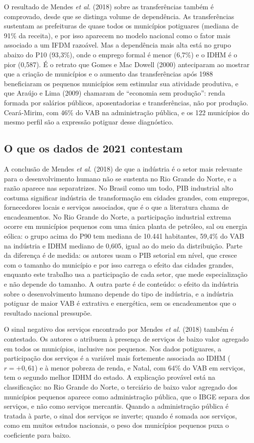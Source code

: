 \documentclass[12pt,a4paper]{article}
\begin{document}
O resultado de Mendes \textit{et al.} (2018) sobre as transferências também é comprovado, desde que se distinga volume de dependência. As transferências sustentam as prefeituras de quase todos os municípios potiguares (mediana de 91\% da receita), e por isso aparecem no modelo nacional como o fator mais associado a um IFDM razoável. Mas a dependência mais alta está no grupo abaixo do P10 (93,3\%), onde o emprego formal é menor (6,7\%) e o IDHM é o pior (0,587). É o retrato que Gomes e Mac Dowell (2000) anteciparam ao mostrar que a criação de municípios e o aumento das transferências após 1988 beneficiaram os pequenos municípios sem estimular sua atividade produtiva, e que Araújo e Lima (2009) chamaram de ``economia sem produção'': renda formada por salários públicos, aposentadorias e transferências, não por produção. Ceará-Mirim, com 46\% do VAB na administração pública, e os 122 municípios do mesmo perfil são a expressão potiguar desse diagnóstico.

\subsection{O que os dados de 2021 contestam}

A conclusão de Mendes \textit{et al.} (2018) de que a indústria é o setor mais relevante para o desenvolvimento humano não se sustenta no Rio Grande do Norte, e a razão aparece nas separatrizes. No Brasil como um todo, PIB industrial alto costuma significar indústria de transformação em cidades grandes, com empregos, fornecedores locais e serviços associados, que é o que a literatura chama de encadeamentos. No Rio Grande do Norte, a participação industrial extrema ocorre em municípios pequenos com uma única planta de petróleo, sal ou energia eólica: o grupo acima do P90 tem mediana de 10.441 habitantes, 59,4\% do VAB na indústria e IDHM mediano de 0,605, igual ao do meio da distribuição. Parte da diferença é de medida: os autores usam o PIB setorial em nível, que cresce com o tamanho do município e por isso carrega o efeito das cidades grandes, enquanto este trabalho usa a participação de cada setor, que mede especialização e não depende do tamanho. A outra parte é de conteúdo: o efeito da indústria sobre o desenvolvimento humano depende do tipo de indústria, e a indústria potiguar de maior VAB é extrativa e energética, sem os encadeamentos que o resultado nacional pressupõe.

O sinal negativo dos serviços encontrado por Mendes \textit{et al.} (2018) também é contestado. Os autores o atribuem à presença de serviços de baixo valor agregado em todos os municípios, inclusive nos pequenos. Nos dados potiguares, a participação dos serviços é a variável mais fortemente associada ao IDHM ($r = +0{,}61$) e à menor pobreza de renda, e Natal, com 64\% do VAB em serviços, tem o segundo melhor IDHM do estado. A explicação provável está na classificação: no Rio Grande do Norte, o terciário de baixo valor agregado dos municípios pequenos aparece como administração pública, que o IBGE separa dos serviços, e não como serviços mercantis. Quando a administração pública é tratada à parte, o sinal dos serviços se inverte; quando é somada aos serviços, como em muitos estudos nacionais, o peso dos municípios pequenos puxa o coeficiente para baixo.
\end{document}
